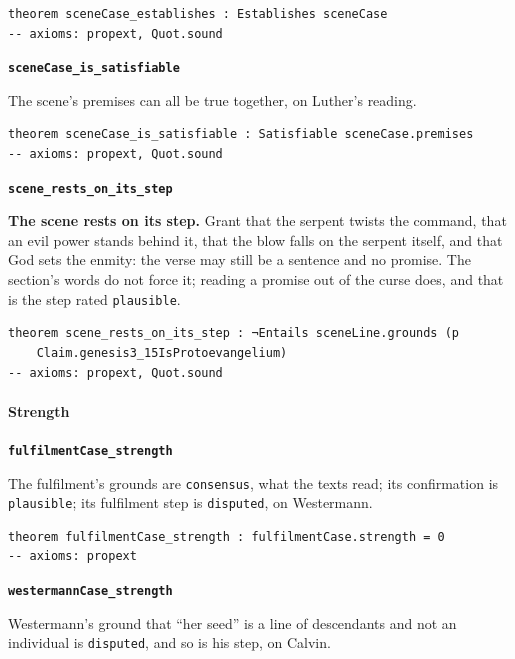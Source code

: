 \documentclass[11pt]{article}
\begin{document}
{\small\begin{verbatim}
theorem sceneCase_establishes : Establishes sceneCase
-- axioms: propext, Quot.sound
\end{verbatim}}
\par\medskip\noindent\textbf{\texttt{scene\allowbreak{}Case\_\allowbreak{}is\_\allowbreak{}satisfiable}}\par\nobreak\noindent
The scene’s premises can all be true together, on Luther’s reading.

{\small\begin{verbatim}
theorem sceneCase_is_satisfiable : Satisfiable sceneCase.premises
-- axioms: propext, Quot.sound
\end{verbatim}}
\par\medskip\noindent\textbf{\texttt{scene\_\allowbreak{}rests\_\allowbreak{}on\_\allowbreak{}its\_\allowbreak{}step}}\par\nobreak\noindent
\textbf{The scene rests on its step.} Grant that the serpent twists the command, that an evil power stands behind it, that the blow falls on the serpent itself, and that God sets the enmity: the verse may still be a sentence and no promise. The section’s words do not force it; reading a promise out of the curse does, and that is the step rated \texttt{plausible}.

{\small\begin{verbatim}
theorem scene_rests_on_its_step : ¬Entails sceneLine.grounds (p
    Claim.genesis3_15IsProtoevangelium)
-- axioms: propext, Quot.sound
\end{verbatim}}
\paragraph*{Strength}
\leavevmode\par\nobreak
\par\medskip\noindent\textbf{\texttt{fulfilment\allowbreak{}Case\_\allowbreak{}strength}}\par\nobreak\noindent
The fulfilment’s grounds are \texttt{consensus}, what the texts read; its confirmation is \texttt{plausible}; its fulfilment step is \texttt{disputed}, on Westermann.

{\small\begin{verbatim}
theorem fulfilmentCase_strength : fulfilmentCase.strength = 0
-- axioms: propext
\end{verbatim}}
\par\medskip\noindent\textbf{\texttt{westermann\allowbreak{}Case\_\allowbreak{}strength}}\par\nobreak\noindent
Westermann’s ground that “her seed” is a line of descendants and not an individual is \texttt{disputed}, and so is his step, on Calvin.
\end{document}
